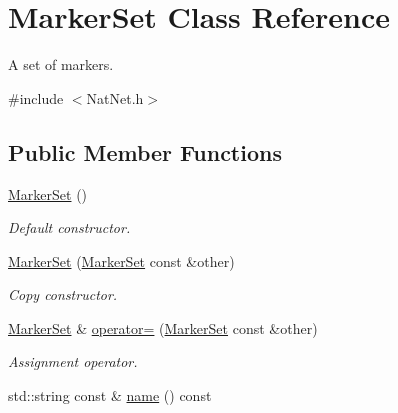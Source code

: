 \hypertarget{classMarkerSet}{\section{\-Marker\-Set \-Class \-Reference}
\label{classMarkerSet}
}


\-A set of markers.  




{\ttfamily \#include $<$\-Nat\-Net.\-h$>$}

\subsection*{\-Public \-Member \-Functions}
\begin{DoxyCompactItemize}
\item 
\hypertarget{classMarkerSet_af44729e54615850f8491f4a951131201}{\hyperlink{classMarkerSet_af44729e54615850f8491f4a951131201}{\-Marker\-Set} ()}\label{classMarkerSet_af44729e54615850f8491f4a951131201}

\begin{DoxyCompactList}\small\item\em \-Default constructor. \end{DoxyCompactList}\item 
\hypertarget{classMarkerSet_aaa2d94ce271768803afcd5558963f603}{\hyperlink{classMarkerSet_aaa2d94ce271768803afcd5558963f603}{\-Marker\-Set} (\hyperlink{classMarkerSet}{\-Marker\-Set} const \&other)}\label{classMarkerSet_aaa2d94ce271768803afcd5558963f603}

\begin{DoxyCompactList}\small\item\em \-Copy constructor. \end{DoxyCompactList}\item 
\hypertarget{classMarkerSet_ad8bf3331c2dd4a3dcf0193f49c5a123a}{\hyperlink{classMarkerSet}{\-Marker\-Set} \& \hyperlink{classMarkerSet_ad8bf3331c2dd4a3dcf0193f49c5a123a}{operator=} (\hyperlink{classMarkerSet}{\-Marker\-Set} const \&other)}\label{classMarkerSet_ad8bf3331c2dd4a3dcf0193f49c5a123a}

\begin{DoxyCompactList}\small\item\em \-Assignment operator. \end{DoxyCompactList}\item 
\hypertarget{classMarkerSet_aeb43b9a16f038d8c55fc05a94022c9fb}{std\-::string const \& \hyperlink{classMarkerSet_aeb43b9a16f038d8c55fc05a94022c9fb}{name} () const }\label{classMarkerSet_aeb43b9a16f038d8c55fc05a94022c9fb}


\end{DoxyCompactItemize}
